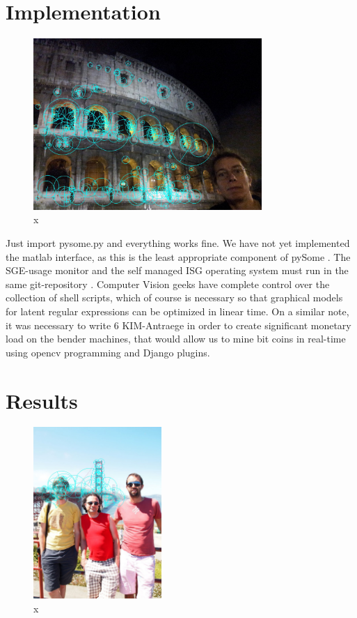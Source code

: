 \documentclass[runningheads]{llncs}
\begin{document}
\section{Implementation}
\begin{figure} \centering \includegraphics[height=6.5cm]{images/tanner.jpg}
\caption{x} \label{fig:label13} \end{figure}
Just import pysome.py and everything works fine. 
We have not yet implemented the matlab interface, as this is the
least appropriate component of pySome \cite{cite:30}.  The SGE-usage monitor and the self managed ISG operating system must run in the same git-repository
\cite{cite:31}.  Computer Vision geeks have complete control over the collection of
shell scripts, which of course is necessary so that graphical models for latent regular expressions 
can be optimized in linear time.  On a similar note, it was necessary to write 6 KIM-Antraege in order to create significant monetary load on the bender machines, that would allow us to mine bit coins in real-time using opencv programming and Django plugins. 


\section{Results}

\begin{figure} \centering \includegraphics[height=6.5cm]{images/SF.jpg}
\caption{x} \label{fig:label14}  \end{figure}
\end{document}
